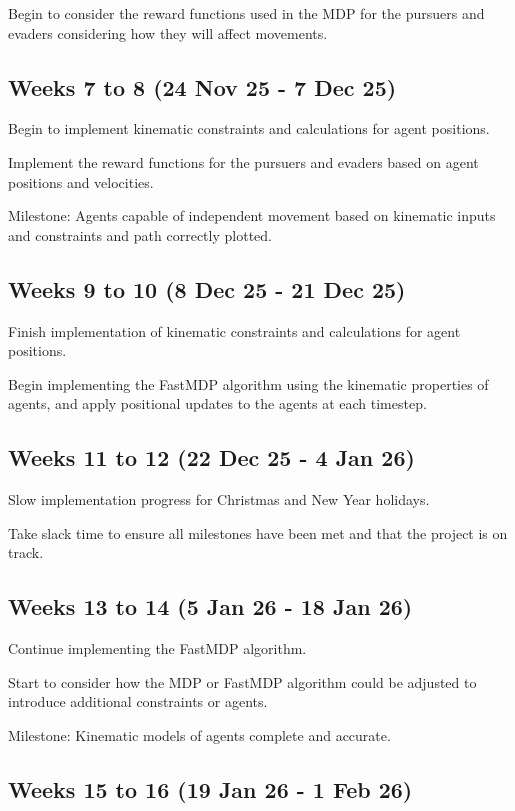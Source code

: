 \begin{refsection}
  Begin to consider the reward functions used in the MDP for the pursuers and evaders considering how they will affect movements.

  \subsection*{Weeks 7 to 8 (24 Nov 25 - 7 Dec 25)}

  Begin to implement kinematic constraints and calculations for agent positions.

  Implement the reward functions for the pursuers and evaders based on agent positions and velocities.

  Milestone: Agents capable of independent movement based on kinematic inputs and constraints and path correctly plotted.

  \subsection*{Weeks 9 to 10 (8 Dec 25 - 21 Dec 25)}

  Finish implementation of kinematic constraints and calculations for agent positions.

  Begin implementing the FastMDP algorithm using the kinematic properties of agents, and apply positional updates to the agents at each timestep.

  \subsection*{Weeks 11 to 12 (22 Dec 25 - 4 Jan 26)}

  Slow implementation progress for Christmas and New Year holidays.

  Take slack time to ensure all milestones have been met and that the project is on track.

  \subsection*{Weeks 13 to 14 (5 Jan 26 - 18 Jan 26)}

  Continue implementing the FastMDP algorithm.

  Start to consider how the MDP or FastMDP algorithm could be adjusted to introduce additional constraints or agents.

  Milestone: Kinematic models of agents complete and accurate.

  \subsection*{Weeks 15 to 16 (19 Jan 26 - 1 Feb 26)}


\end{refsection}
